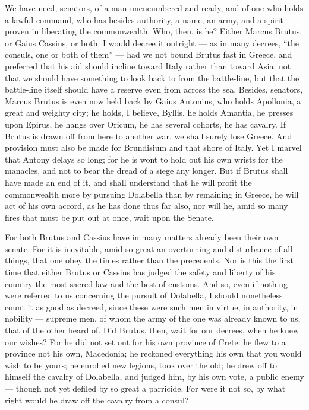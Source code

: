  We have need, senators, of a man unencumbered and ready, and of one who holds a lawful command, who has besides authority, a name, an army, and a spirit proven in liberating the commonwealth. Who, then, is he? Either Marcus Brutus, or Gaius Cassius, or both. I would decree it outright --- as in many decrees, ``the consuls, one or both of them'' --- had we not bound Brutus fast in Greece, and preferred that his aid should incline toward Italy rather than toward Asia: not that we should have something to look back to from the battle-line, but that the battle-line itself should have a reserve even from across the sea. Besides, senators, Marcus Brutus is even now held back by Gaius Antonius, who holds Apollonia, a great and weighty city; he holds, I believe, Byllis, he holds Amantia, he presses upon Epirus, he hangs over Oricum, he has several cohorts, he has cavalry. If Brutus is drawn off from here to another war, we shall surely lose Greece. And provision must also be made for Brundisium and that shore of Italy. Yet I marvel that Antony delays so long; for he is wont to hold out his own wrists for the manacles, and not to bear the dread of a siege any longer. But if Brutus shall have made an end of it, and shall understand that he will profit the commonwealth more by pursuing Dolabella than by remaining in Greece, he will act of his own accord, as he has done thus far also, nor will he, amid so many fires that must be put out at once, wait upon the Senate.

 For both Brutus and Cassius have in many matters already been their own senate. For it is inevitable, amid so great an overturning and disturbance of all things, that one obey the times rather than the precedents. Nor is this the first time that either Brutus or Cassius has judged the safety and liberty of his country the most sacred law and the best of customs. And so, even if nothing were referred to us concerning the pursuit of Dolabella, I should nonetheless count it as good as decreed, since these were such men in virtue, in authority, in nobility --- supreme men, of whom the army of the one was already known to us, that of the other heard of. Did Brutus, then, wait for our decrees, when he knew our wishes? For he did not set out for his own province of Crete: he flew to a province not his own, Macedonia; he reckoned everything his own that you would wish to be yours; he enrolled new legions, took over the old; he drew off to himself the cavalry of Dolabella, and judged him, by his own vote, a public enemy --- though not yet defiled by so great a parricide. For were it not so, by what right would he draw off the cavalry from a consul?


